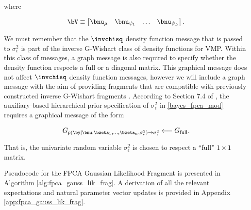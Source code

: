 \documentclass[12pt]{article}
\def\sigsqeps{\sigma^2_{\epsilon}}
\def\numu{\bnu_\mu}
\newcommand\nupsi[1]{\bnu_{\psi_{#1}}}
\theoremstyle{plain}
\theoremstyle{definition}
\theoremstyle{remark}
\begin{document}
\noindent where

\begin{equation}
	\bV \equiv \begin{bmatrix}
		\numu & \nupsi{1} & \dots & \nupsi{L}
	\end{bmatrix}.
\label{V_mat}
\end{equation}

\noindent We must remember that the $\invchisq$ density function message that is passed
to $\sigsqeps$ is part of the inverse G-Wishart class of density functions for VMP. Within this class of messages,
a graph message is also required to specify whether the density function respects a full or a diagonal matrix. This
graphical message does not affect $\invchisq$ density function messages, however we will include
a graph message with the aim of providing fragments that are compatible with previously constructed inverse
G-Wishart fragments \cite[Algorithms 1 \& 2]{maestrini20}. According to Section 7.4 of ,
the auxiliary-based hierarchical prior specification of $\sigsqeps$ in \eqref{bayes_fpca_mod} requires a
graphical message of the form

\begin{equation}
	G_{p (\by | \bnu, \bzeta_1, \dots, \bzeta_n, \sigsqeps) \rightarrow \sigsqeps}
		\longleftarrow
			G_{\text{full}}.
\label{G_lik_sigsqeps}
\end{equation}

\noindent That is, the univariate random variable $\sigsqeps$ is chosen to respect a ``full'' $1 \times 1$ matrix.

Pseudocode for the FPCA Gaussian Likelihood Fragment is presented in Algorithm \ref{alg:fpca_gauss_lik_frag}.
A derivation of all the relevant expectations and natural parameter vector updates is provided in Appendix
\ref{app:fpca_gauss_lik_frag}.
\end{document}
